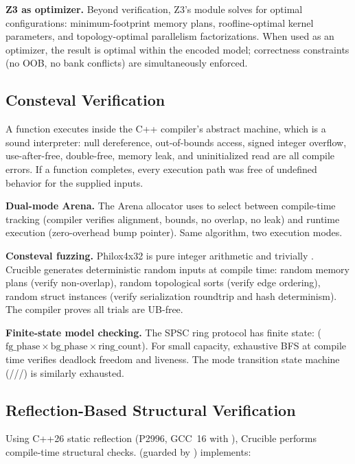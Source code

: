 \textbf{Z3 as optimizer.}
Beyond verification, Z3's  module solves for optimal configurations: minimum-footprint memory plans, roofline-optimal kernel parameters, and topology-optimal parallelism factorizations.
When used as an optimizer, the result is optimal within the encoded model; correctness constraints (no OOB, no bank conflicts) are simultaneously enforced.

\subsection{Consteval Verification}

A  function executes inside the C++ compiler's abstract machine, which is a sound interpreter: null dereference, out-of-bounds access, signed integer overflow, use-after-free, double-free, memory leak, and uninitialized read are all compile errors.
If a  function completes, every execution path was free of undefined behavior for the supplied inputs.

\textbf{Dual-mode Arena.}
The Arena allocator uses  to select between compile-time tracking (compiler verifies alignment, bounds, no overlap, no leak) and runtime execution (zero-overhead bump pointer).
Same algorithm, two execution modes.

\textbf{Consteval fuzzing.}
Philox4x32 is pure integer arithmetic and trivially .
Crucible generates deterministic random inputs at compile time: random memory plans (verify non-overlap), random topological sorts (verify edge ordering), random struct instances (verify serialization roundtrip and hash determinism).
The compiler proves all trials are UB-free.

\textbf{Finite-state model checking.}
The SPSC ring protocol has finite state: ($\text{fg\_phase} \times \text{bg\_phase} \times \text{ring\_count}$).
For small capacity, exhaustive BFS at compile time verifies deadlock freedom and liveness.
The mode transition state machine (///) is similarly exhausted.

\subsection{Reflection-Based Structural Verification}

Using C++26 static reflection (P2996, GCC~16 with ), Crucible performs compile-time structural checks.
 (guarded by ) implements:

